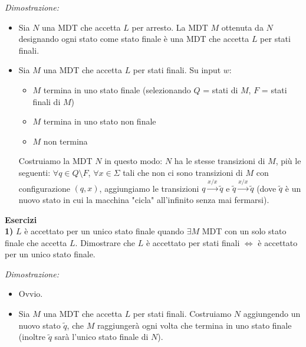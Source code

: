 \textit{Dimostrazione:}
\begin{itemize}
    \item[$\impliedby$)] Sia $N$ una MDT che accetta $L$ per arresto. La MDT $M$ ottenuta da $N$ designando ogni stato come stato finale è una MDT che accetta $L$ per stati finali.
    
    \item[$\implies$)] Sia $M$ una MDT che accetta $L$ per stati finali. Su input $w$:
    \begin{itemize}
        \item $M$ termina in uno stato finale (selezionando $Q$ = stati di $M$, $F$ = stati finali di $M$)
        \item $M$ termina in uno stato non finale
        \item $M$ non termina
    \end{itemize}
    Costruiamo la MDT $N$ in questo modo: $N$ ha le stesse transizioni di $M$, più le seguenti: $\forall q \in Q \setminus F$, $\forall x \in \Sigma$ tali che non ci sono transizioni di $M$ con configurazione $(q, x)$, aggiungiamo le transizioni $q \xrightarrow{x/x} \tilde{q}$ e $\tilde{q} \xrightarrow{x/x} \tilde{q}$ (dove $\tilde{q}$ è un nuovo stato in cui la macchina "cicla" all'infinito senza mai fermarsi).
    \begin{center}
    \end{center}
\end{itemize}

\vspace{0.6cm}
\textbf{Esercizi} \\
\textbf{1)} $L$ è accettato per un unico stato finale quando $\exists M$ MDT con un solo stato finale che accetta $L$. Dimostrare che $L$ è accettato per stati finali $\iff$ è accettato per un unico stato finale.

\textit{Dimostrazione:}
\begin{itemize}
    \item[$\impliedby$)] Ovvio.
    \item[$\implies$)] Sia $M$ una MDT che accetta $L$ per stati finali. Costruiamo $N$ aggiungendo un nuovo stato $\tilde{q}$, che $M$ raggiungerà ogni volta che termina in uno stato finale (inoltre $\tilde{q}$ sarà l'unico stato finale di $N$).
\end{itemize}

